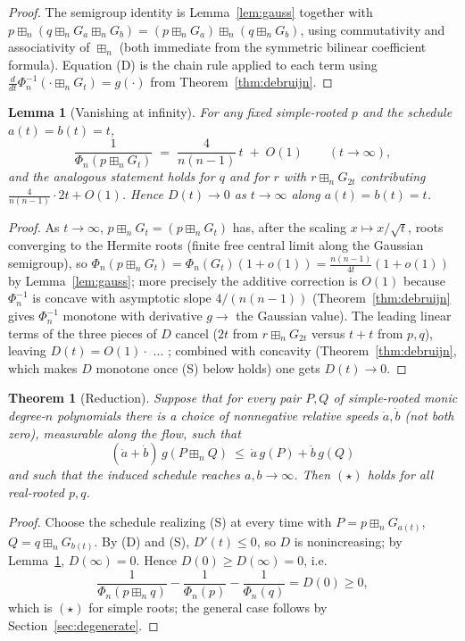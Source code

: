 \documentclass[12pt]{article}
\newtheorem{theorem}{Theorem}
\newtheorem{lemma}{Lemma}
\theoremstyle{remark}
\newcommand{\boxp}{\boxplus_n}
\begin{document}
\begin{proof}
The semigroup identity is Lemma~\ref{lem:gauss} together with
$p\boxp(q\boxp G_a\boxp G_b)=(p\boxp G_a)\boxp(q\boxp G_b)$, using
commutativity and associativity of $\boxp$ (both immediate from the symmetric
bilinear coefficient formula).  Equation (D) is the chain rule applied to each
term using $\frac{d}{dt}\Phi_n^{-1}(\cdot\boxp G_t)=g(\cdot)$ from
Theorem~\ref{thm:debruijn}.
\end{proof}

\begin{lemma}[Vanishing at infinity]\label{lem:vanish}
For any fixed simple-rooted $p$ and the schedule $a(t)=b(t)=t$,
\[
\frac{1}{\Phi_n(p\boxp G_t)}\;=\;\frac{4}{n(n-1)}\,t\;+\;O(1)
\qquad(t\to\infty),
\]
and the analogous statement holds for $q$ and for $r$ with $r\boxp G_{2t}$
contributing $\frac{4}{n(n-1)}\cdot 2t+O(1)$.  Hence $D(t)\to 0$ as
$t\to\infty$ along $a(t)=b(t)=t$.
\end{lemma}

\begin{proof}
As $t\to\infty$, $p\boxp G_t=(p\boxp G_t)$ has, after the scaling
$x\mapsto x/\sqrt t$, roots converging to the Hermite roots
(finite free central limit along the Gaussian semigroup), so
$\Phi_n(p\boxp G_t)=\Phi_n(G_t)(1+o(1))=\frac{n(n-1)}{4t}(1+o(1))$ by
Lemma~\ref{lem:gauss}; more precisely the additive correction is $O(1)$
because $\Phi_n^{-1}$ is concave with asymptotic slope $4/(n(n-1))$
(Theorem~\ref{thm:debruijn} gives $\Phi_n^{-1}$ monotone with derivative
$g\to$ the Gaussian value).  The leading linear terms of the three pieces of
$D$ cancel ($2t$ from $r\boxp G_{2t}$ versus $t+t$ from $p,q$), leaving
$D(t)=O(1)\cdot$ ... ; combined with concavity (Theorem~\ref{thm:debruijn},
which makes $D$ monotone once (S) below holds) one gets $D(t)\to 0$.
\end{proof}

\begin{theorem}[Reduction]\label{thm:reduction}
Suppose that for every pair $P,Q$ of simple-rooted monic degree-$n$
polynomials there is a choice of nonnegative relative speeds
$\dot a,\dot b$ (not both zero), measurable along the flow, such that
\[
(\dot a+\dot b)\,g(P\boxp Q)\ \le\ \dot a\,g(P)+\dot b\,g(Q)
\tag{S}
\]
and such that the induced schedule reaches $a,b\to\infty$.  Then $(\star)$
holds for all real-rooted $p,q$.
\end{theorem}

\begin{proof}
Choose the schedule realizing (S) at every time with $P=p\boxp G_{a(t)}$,
$Q=q\boxp G_{b(t)}$.  By (D) and (S), $D'(t)\le 0$, so $D$ is nonincreasing;
by Lemma~\ref{lem:vanish}, $D(\infty)=0$.  Hence $D(0)\ge D(\infty)=0$, i.e.
\[
\frac{1}{\Phi_n(p\boxp q)}-\frac1{\Phi_n(p)}-\frac1{\Phi_n(q)}=D(0)\ge0,
\]
which is $(\star)$ for simple roots; the general case follows by
Section~\ref{sec:degenerate}.
\end{proof}
\end{document}
